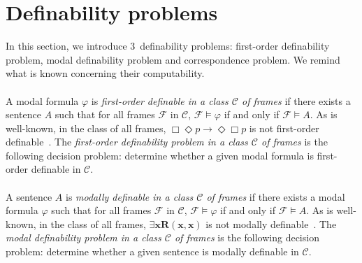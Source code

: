 \documentclass[draft]{article}
\def\fod{\mathtt{fod}}
\begin{document}
\section{Definability problems}\label{section:definability:problems}
%
%
In this section, we introduce $3$~definability problems: first-order definability problem, modal definability problem and correspondence problem.
We remind what is known concerning their computability.
%
%
%
%
\\
\\
%
%
A modal formula $\varphi$ is {\it first-order definable in a class ${\mathcal C}$ of frames}\/ if there exists a sentence $A$ such that for all frames ${\mathcal F}$ in ${\mathcal C}$, ${\mathcal F}{\models}\varphi$ if and only if ${\mathcal F}{\models}A$.
As is well-known, in the class of all frames, $\Box\Diamond p\rightarrow\Diamond\Box p$ is not first-order definable~\cite[Chapter~$3$]{Blackburn:deRijke:Venema:2001}.
The {\it first-order definability problem in a class ${\mathcal C}$ of frames}\/ is the following decision problem: determine whether a given modal formula is first-order definable in ${\mathcal C}$.
%
%
\\
\\
%
%
%
%
%
%
%
%
A sentence $A$ is {\it modally definable in a class ${\mathcal C}$ of frames}\/ if there exists a modal formula $\varphi$ such that for all frames ${\mathcal F}$ in ${\mathcal C}$, ${\mathcal F}{\models}\varphi$ if and only if ${\mathcal F}{\models}A$.
As is well-known, in the class of all frames, $\exists\mathbf{x}\mathbf{R}(\mathbf{x},\mathbf{x})$ is not modally definable~\cite[Chapter~$3$]{Blackburn:deRijke:Venema:2001}.
The {\it modal definability problem in a class ${\mathcal C}$ of frames}\/ is the following decision problem: determine whether a given sentence is modally definable in ${\mathcal C}$.
%
%
\end{document}
